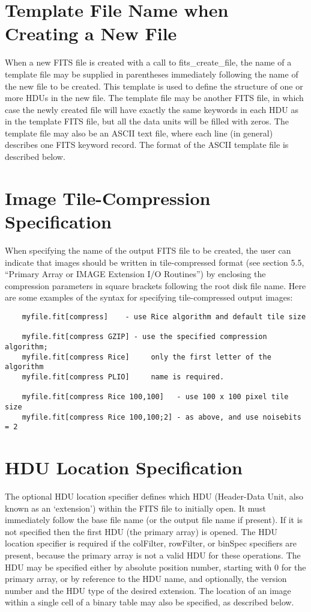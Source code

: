 \documentclass[11pt]{book}
\begin{document}
\section{Template File Name when Creating a New File}

When a new FITS file is created with a call to fits\_create\_file, the
name of a template file may be supplied in parentheses immediately
following the name of the new file to be created.  This template is
used to define the structure of one or more HDUs in the new file.  The
template file may be another FITS file, in which case the newly created
file will have exactly the same keywords in each HDU as in the template
FITS file, but all the data units will be filled with zeros.  The
template file may also be an ASCII text file, where each line (in
general) describes one FITS keyword record.  The format of the ASCII
template file is described below.


\section{Image Tile-Compression Specification}

When specifying the name of the output FITS file to be created, the
user can indicate that images should be written in tile-compressed
format (see section 5.5, ``Primary Array or IMAGE Extension I/O
Routines'') by enclosing the compression parameters in square brackets
following the root disk file name.  Here are some examples of the
syntax for specifying tile-compressed output images:

\begin{verbatim}
    myfile.fit[compress]    - use Rice algorithm and default tile size

    myfile.fit[compress GZIP] - use the specified compression algorithm;
    myfile.fit[compress Rice]     only the first letter of the algorithm
    myfile.fit[compress PLIO]     name is required.

    myfile.fit[compress Rice 100,100]   - use 100 x 100 pixel tile size
    myfile.fit[compress Rice 100,100;2] - as above, and use noisebits = 2
\end{verbatim}


\section{HDU Location Specification}

The optional HDU location specifier defines which HDU (Header-Data
Unit, also known as an `extension') within the FITS file to initially
open.  It must immediately follow the base file name (or the output
file name if present).  If it is not specified then the first HDU (the
primary array) is opened.  The HDU location specifier is required if
the colFilter, rowFilter, or binSpec specifiers are present, because
the primary array is not a valid HDU for these operations. The HDU may
be specified either by absolute position number, starting with 0 for
the primary array, or by reference to the HDU name, and optionally, the
version number and the HDU type of the desired extension.  The location
of an image within a single cell of a binary table may also be
specified, as described below.
\end{document}
